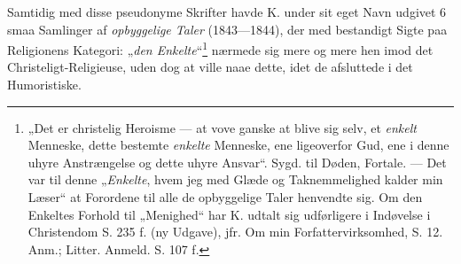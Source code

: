\documentclass[12pt,a4paper]{book}
\begin{document}
Samtidig med disse pseudonyme Skrifter havde K. under sit eget Navn udgivet
6 smaa Samlinger af \emph{opbyggelige Taler} (1843---1844), der med
bestandigt Sigte paa Religionens Kategori: „\emph{den Enkelte}“\footnote{%
„Det er christelig Heroisme --- at vove ganske at blive sig selv, et
\emph{enkelt} Menneske, dette bestemte \emph{enkelte} Menneske, ene ligeoverfor
Gud, ene i denne uhyre Anstrængelse og dette uhyre Ansvar“.
Sygd. til Døden, Fortale. --- Det var til denne „\emph{Enkelte}, hvem jeg
med Glæde og Taknemmelighed kalder min Læser“ at Forordene til alle de
opbyggelige Taler henvendte sig. Om den Enkeltes Forhold til „Menighed“ har
K. udtalt sig udførligere i Indøvelse i Christendom S. 235 f. (ny Udgave),
jfr. Om min Forfattervirksomhed, S. 12. Anm.; Litter. Anmeld. S. 107 f.%
} nærmede sig mere og mere hen imod det Christeligt-Religieuse, uden dog at
ville naae dette, idet de afsluttede i det Humoristiske.
\end{document}
